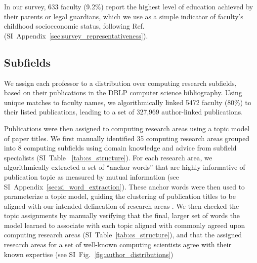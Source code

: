 \documentclass[reprint, twocolumn, aps, nofootinbib, superscriptaddress, longbibliography]{revtex4-1}
\begin{document}
In our survey, 633 faculty (9.2\%) report the highest level of education achieved by their parents or legal guardians, which we use as a simple indicator of faculty's childhood socioeconomic status, following Ref.~\cite{morgan2021socioeconomic} (SI~Appendix~\ref{sec:survey_representativeness}). 

\subsection{Subfields} 
We assign each professor to a distribution over computing research subfields, based on their publications in the DBLP computer science bibliography. Using unique matches to faculty names, we algorithmically linked 5472 faculty (80\%) to their listed publications, leading to a set of 327,969 author-linked publications. 

Publications were then assigned to computing research areas using a topic model of paper titles. We first manually identified 35 computing research areas grouped into 8 computing subfields using domain knowledge and advice from subfield specialists (SI~Table ~\ref{tab:cs_structure}). For each research area, we algorithmically extracted a set of ``anchor words'' that are highly informative of publication topic as measured by mutual information \cite{jagarlamudi2012incorporating} (see SI~Appendix~\ref{sec:si_word_extraction}). These anchor words were then used to parameterize a topic model, guiding the clustering of publication titles to be aligned with our intended delineation of research areas \cite{gallagher2017anchored}. We then checked the topic assignments by manually verifying that the final, larger set of words the model learned to associate with each topic aligned with commonly agreed upon computing research areas (SI~Table~\ref{tab:cs_structure}), and that the assigned research areas for a set of well-known computing scientists agree with their known expertise (see SI~Fig.~\ref{fig:author_distributions}) 
\end{document}

